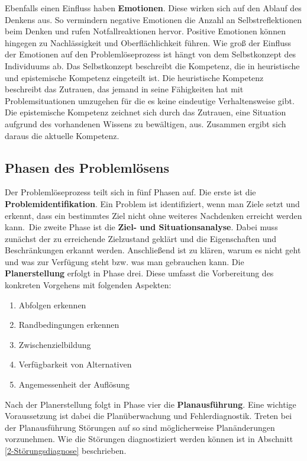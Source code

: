 Ebenfalls einen Einfluss haben \textbf{Emotionen}.
Diese wirken sich auf den Ablauf des Denkens aus. So vermindern negative Emotionen die Anzahl an Selbstreflektionen beim Denken und rufen Notfallreaktionen hervor. Positive Emotionen können hingegen zu Nachlässigkeit und Oberflächlichkeit führen. Wie groß der Einfluss der Emotionen auf den Problemlöseprozess ist hängt von dem Selbstkonzept des Individuums ab. Das Selbstkonzept beschreibt die Kompetenz, die in heuristische und epistemische Kompetenz eingeteilt ist. Die heuristische Kompetenz beschreibt das Zutrauen, das jemand in seine Fähigkeiten hat mit Problemsituationen umzugehen für die es keine eindeutige Verhaltensweise gibt. Die epistemische Kompetenz zeichnet sich durch das Zutrauen, eine Situation aufgrund des vorhandenen Wissens zu bewältigen, aus. Zusammen ergibt sich daraus die aktuelle Kompetenz. \cite{Dorner1984}

\subsection{Phasen des Problemlösens}
\label{2:Phasen-Problemloesen}
Der Problemlöseprozess teilt sich in fünf Phasen auf. Die erste ist die \textbf{Problemidentifikation}. \glqq Ein Problem ist identifiziert, wenn man Ziele setzt und erkennt, dass ein bestimmtes Ziel nicht ohne weiteres Nachdenken erreicht werden kann.\grqq \citep[146]{Betsch2011}\ Die zweite Phase ist die \textbf{Ziel- und Situationsanalyse}. Dabei muss zunächst der zu erreichende Zielzustand geklärt und die Eigenschaften und Beschränkungen erkannt werden. Anschließend ist zu klären, warum es nicht geht und was zur Verfügung steht bzw. was man gebrauchen kann. Die \textbf{Planerstellung} erfolgt in Phase drei. Diese umfasst die Vorbereitung des konkreten Vorgehens mit folgenden Aspekten:
\begin{enumerate}
\item Abfolgen erkennen
\item Randbedingungen erkennen
\item Zwischenzielbildung
\item Verfügbarkeit von Alternativen
\item Angemessenheit der Auflösung
\end{enumerate}
Nach der Planerstellung folgt in Phase vier die \textbf{Planausführung}. Eine wichtige Voraussetzung ist dabei die Planüberwachung und Fehlerdiagnostik. Treten bei der Planausführung Störungen auf so sind möglicherweise Planänderungen vorzunehmen. Wie die Störungen diagnostiziert werden können ist in Abschnitt \ref{2-Störungsdiagnose} beschrieben.

